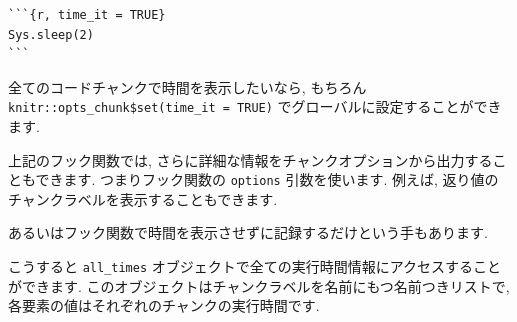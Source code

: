\documentclass[
  11pt,
  lualatex,
  ja=standard]{bxjsreport}
\newenvironment{Shaded}{\begin{snugshade}}{\end{snugshade}}
\newcommand{\AttributeTok}[1]{\textcolor[rgb]{0.77,0.63,0.00}{#1}}
\newcommand{\CommentTok}[1]{\textcolor[rgb]{0.56,0.35,0.01}{\textit{#1}}}
\newcommand{\ConstantTok}[1]{\textcolor[rgb]{0.00,0.00,0.00}{#1}}
\newcommand{\ControlFlowTok}[1]{\textcolor[rgb]{0.13,0.29,0.53}{\textbf{#1}}}
\newcommand{\FunctionTok}[1]{\textcolor[rgb]{0.00,0.00,0.00}{#1}}
\newcommand{\NormalTok}[1]{#1}
\newcommand{\OtherTok}[1]{\textcolor[rgb]{0.56,0.35,0.01}{#1}}
\newcommand{\SpecialCharTok}[1]{\textcolor[rgb]{0.00,0.00,0.00}{#1}}
\newcommand{\StringTok}[1]{\textcolor[rgb]{0.31,0.60,0.02}{#1}}
\begin{document}
\begin{verbatim}
```{r, time_it = TRUE}
Sys.sleep(2)
```
\end{verbatim}

全てのコードチャンクで時間を表示したいなら, もちろん \texttt{knitr::opts\_chunk\$set(time\_it = TRUE)} でグローバルに設定することができます.

上記のフック関数では, さらに詳細な情報をチャンクオプションから出力することもできます. つまりフック関数の \texttt{options} 引数を使います. 例えば, 返り値のチャンクラベルを表示することもできます.

\begin{Shaded}
\end{Shaded}

あるいはフック関数で時間を表示させずに記録するだけという手もあります.

\begin{Shaded}
\end{Shaded}

こうすると \texttt{all\_times} オブジェクトで全ての実行時間情報にアクセスすることができます. このオブジェクトはチャンクラベルを名前にもつ名前つきリストで, 各要素の値はそれぞれのチャンクの実行時間です.
\end{document}
